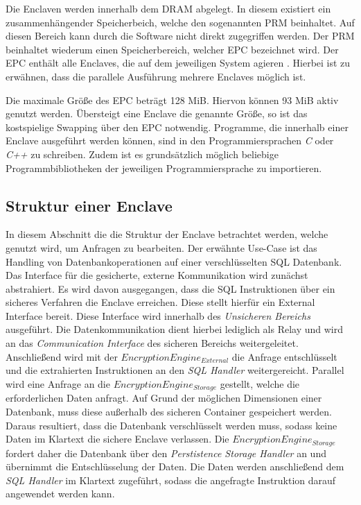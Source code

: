  Die Enclaven werden innerhalb dem \ac{DRAM} abgelegt. In diesem existiert ein zusammenhängender Speicherbeich, welche den sogenannten \ac{PRM} beinhaltet. Auf diesen Bereich kann durch die Software nicht direkt zugegriffen werden. Der \ac{PRM} beinhaltet wiederum einen Speicherbereich, welcher \ac{EPC} bezeichnet wird. Der \ac{EPC} enthält alle Enclaves, die auf dem jeweiligen System agieren \cite{sgx-bibel}. Hierbei ist zu erwähnen, dass die parallele Ausführung mehrere Enclaves möglich ist.
 
 Die maximale Größe des \acs{EPC} beträgt 128 MiB. Hiervon können 93 MiB aktiv genutzt werden. Übersteigt eine Enclave die genannte Größe, so ist das kostspielige Swapping über den \ac{EPC} notwendig. \cite{sgx-performance} Programme, die innerhalb einer Enclave ausgeführt werden können, sind in den Programmiersprachen \emph{C} oder \emph{C++} zu schreiben. Zudem ist es grundsätzlich möglich beliebige Programmbibliotheken der jeweiligen Programmiersprache zu importieren.
 
 \subsection{Struktur einer Enclave}
 In diesem Abschnitt die die Struktur der Enclave betrachtet werden, welche genutzt wird, um Anfragen zu bearbeiten. Der erwähnte Use-Case ist das Handling von Datenbankoperationen auf einer verschlüsselten \ac{SQL} Datenbank. Das Interface für die gesicherte, externe Kommunikation wird zunächst abstrahiert. Es wird davon ausgegangen, dass die \ac{SQL} Instruktionen über ein sicheres Verfahren die Enclave erreichen. Diese stellt hierfür ein External Interface bereit. Diese Interface wird innerhalb des \emph{Unsicheren Bereichs} ausgeführt. Die Datenkommunikation dient hierbei lediglich als Relay und wird an das \emph{Communication Interface} des sicheren Bereichs weitergeleitet. \\
 
 
 Anschließend wird mit der $EncryptionEngine_{External}$ die Anfrage entschlüsselt und die extrahierten Instruktionen an den \emph{SQL Handler} weitergereicht. Parallel wird eine Anfrage an die $EncryptionEngine_{Storage}$ gestellt, welche die erforderlichen Daten anfragt. Auf Grund der möglichen Dimensionen einer Datenbank, muss diese außerhalb des sicheren Container gespeichert werden. Daraus resultiert, dass die Datenbank verschlüsselt werden muss, sodass keine Daten im Klartext die sichere Enclave verlassen. Die $EncryptionEngine_{Storage}$ fordert daher die Datenbank über den \emph{Perstistence Storage Handler} an und übernimmt die Entschlüsselung der Daten. Die Daten werden anschließend dem \emph{\ac{SQL} Handler} im Klartext zugeführt, sodass die angefragte Instruktion darauf angewendet werden kann. \\
 
